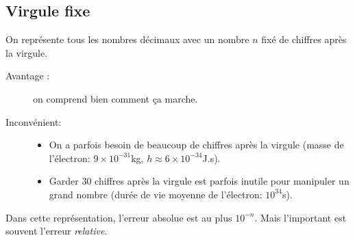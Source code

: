 \subsection{Virgule fixe}

On représente tous les nombres décimaux avec un nombre $n$ fixé de chiffres après la virgule.

\begin{description}
  \item[Avantage :] on comprend bien comment ça marche. 
  \item[Inconvénient:]
\begin{itemize}
\item[\textbullet] On a parfois besoin de beaucoup de chiffres après la virgule 
(masse de l'électron: $9\times{}10^{-31}$kg, $h\approx 6\times10^{-34}$J.s).
\item[\textbullet] Garder $30$ chiffres après la virgule est parfois inutile pour manipuler
  un grand nombre (durée de vie moyenne de l'électron: $10^{34}$s).
\end{itemize}
\end{description}


Dans cette représentation, l'erreur absolue est au plus $10^{-n}$. Mais l'important est souvent l'erreur \emph{relative}.

